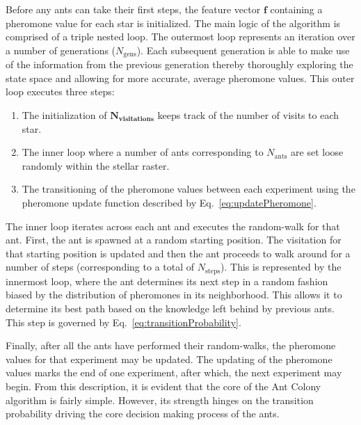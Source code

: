 Before any ants can take their first steps, the feature vector $\mathbf{f}$ containing a pheromone value for each star is initialized. The main logic of the algorithm is comprised of a triple nested loop. The outermost loop represents an iteration over a number of generations ($N_{\text{gens}}$). Each subsequent generation is able to make use of the information from the previous generation thereby thoroughly exploring the state space and allowing for more accurate, average pheromone values. This outer loop executes three steps:
\begin{enumerate}
    \item The initialization of $\mathbf{N_\text{visitations}}$ keeps track of the number of visits to each star.
    \item The inner loop where a number of ants corresponding to $N_\text{ants}$ are set loose randomly within the stellar raster.
    \item The transitioning of the pheromone values between each experiment using the pheromone update function described by Eq.~\eqref{eq:updatePheromone}.
\end{enumerate}
The inner loop iterates across each ant and executes the random-walk for that ant. First, the ant is spawned at a random starting position. The visitation for that starting position is updated and then the ant proceeds to walk around for a number of steps (corresponding to a total of $N_{\text{steps}}$). This is represented by the innermost loop, where the ant determines its next step in a random fashion biased by the distribution of pheromones in its neighborhood. This allows it to determine its best path based on the knowledge left behind by previous ants. This step is governed by Eq.~\eqref{eq:transitionProbability}.

Finally, after all the ants have performed their random-walks, the pheromone values for that experiment may be updated. The updating of the pheromone values marks the end of one experiment, after which, the next experiment may begin. From this description, it is evident that the core of the Ant Colony algorithm is fairly simple. However, its strength hinges on the transition probability driving the core decision making process of the ants.

